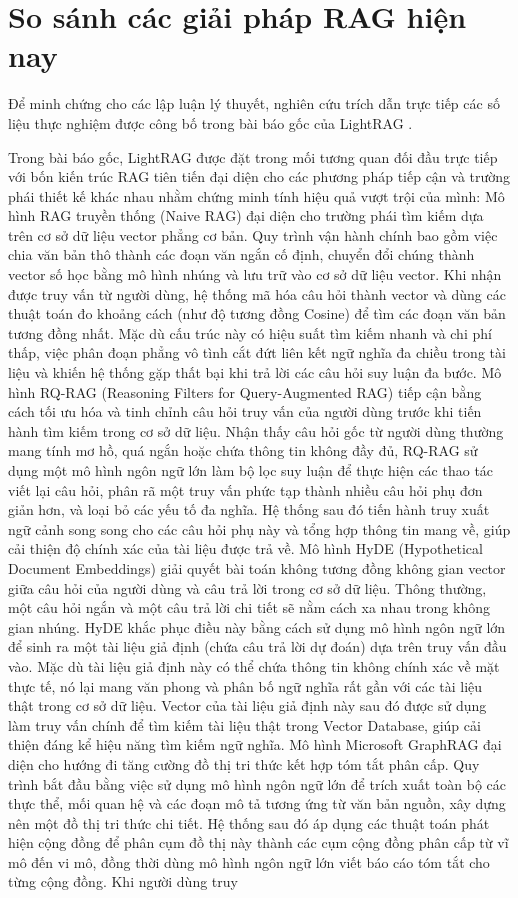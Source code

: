 \section{So sánh các giải pháp RAG hiện nay}
\indent Để minh chứng cho các lập luận lý thuyết, nghiên cứu trích dẫn trực tiếp các số liệu thực nghiệm được công bố trong bài báo gốc của LightRAG \cite{guo2025lightrag}.

\indent Trong bài báo gốc, LightRAG được đặt trong mối tương quan đối đầu trực tiếp với bốn kiến trúc RAG tiên tiến đại diện cho các phương pháp tiếp cận và trường phái thiết kế khác nhau nhằm chứng minh tính hiệu quả vượt trội của mình: Mô hình RAG truyền thống (Naive RAG) đại diện cho trường phái tìm kiếm dựa trên cơ sở dữ liệu vector phẳng cơ bản. Quy trình vận hành chính bao gồm việc chia văn bản thô thành các đoạn văn ngắn cố định, chuyển đổi chúng thành vector số học bằng mô hình nhúng và lưu trữ vào cơ sở dữ liệu vector. Khi nhận được truy vấn từ người dùng, hệ thống mã hóa câu hỏi thành vector và dùng các thuật toán đo khoảng cách (như độ tương đồng Cosine) để tìm các đoạn văn bản tương đồng nhất. Mặc dù cấu trúc này có hiệu suất tìm kiếm nhanh và chi phí thấp, việc phân đoạn phẳng vô tình cắt đứt liên kết ngữ nghĩa đa chiều trong tài liệu và khiến hệ thống gặp thất bại khi trả lời các câu hỏi suy luận đa bước. Mô hình RQ-RAG (Reasoning Filters for Query-Augmented RAG) tiếp cận bằng cách tối ưu hóa và tinh chỉnh câu hỏi truy vấn của người dùng trước khi tiến hành tìm kiếm trong cơ sở dữ liệu. Nhận thấy câu hỏi gốc từ người dùng thường mang tính mơ hồ, quá ngắn hoặc chứa thông tin không đầy đủ, RQ-RAG sử dụng một mô hình ngôn ngữ lớn làm bộ lọc suy luận để thực hiện các thao tác viết lại câu hỏi, phân rã một truy vấn phức tạp thành nhiều câu hỏi phụ đơn giản hơn, và loại bỏ các yếu tố đa nghĩa. Hệ thống sau đó tiến hành truy xuất ngữ cảnh song song cho các câu hỏi phụ này và tổng hợp thông tin mang về, giúp cải thiện độ chính xác của tài liệu được trả về. Mô hình HyDE (Hypothetical Document Embeddings) giải quyết bài toán không tương đồng không gian vector giữa câu hỏi của người dùng và câu trả lời trong cơ sở dữ liệu. Thông thường, một câu hỏi ngắn và một câu trả lời chi tiết sẽ nằm cách xa nhau trong không gian nhúng. HyDE khắc phục điều này bằng cách sử dụng mô hình ngôn ngữ lớn để sinh ra một tài liệu giả định (chứa câu trả lời dự đoán) dựa trên truy vấn đầu vào. Mặc dù tài liệu giả định này có thể chứa thông tin không chính xác về mặt thực tế, nó lại mang văn phong và phân bố ngữ nghĩa rất gần với các tài liệu thật trong cơ sở dữ liệu. Vector của tài liệu giả định này sau đó được sử dụng làm truy vấn chính để tìm kiếm tài liệu thật trong Vector Database, giúp cải thiện đáng kể hiệu năng tìm kiếm ngữ nghĩa. Mô hình Microsoft GraphRAG đại diện cho hướng đi tăng cường đồ thị tri thức kết hợp tóm tắt phân cấp. Quy trình bắt đầu bằng việc sử dụng mô hình ngôn ngữ lớn để trích xuất toàn bộ các thực thể, mối quan hệ và các đoạn mô tả tương ứng từ văn bản nguồn, xây dựng nên một đồ thị tri thức chi tiết. Hệ thống sau đó áp dụng các thuật toán phát hiện cộng đồng để phân cụm đồ thị này thành các cụm cộng đồng phân cấp từ vĩ mô đến vi mô, đồng thời dùng mô hình ngôn ngữ lớn viết báo cáo tóm tắt cho từng cộng đồng. Khi người dùng truy 